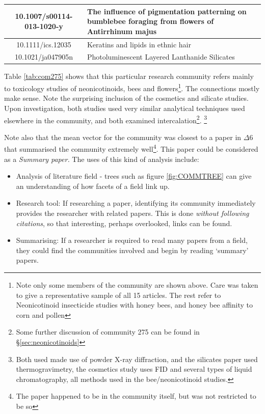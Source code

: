 \begin{table}[H]
\begin{tabular}{||c|X||}
10.1007/s00114-013-1020-y        & \footnotesize{The influence of pigmentation patterning on bumblebee foraging from flowers of Antirrhinum majus                                                                  } \\ \hline
10.1111/ics.12035                & \footnotesize{ Keratins and lipids in ethnic hair                                                                                                                                } \\ \hline
10.1021/ja047905n                & \footnotesize{Photoluminescent Layered Lanthanide Silicates                                                                                                                     } \\ \hline
\end{tabular}
\end{table}

Table \ref{tab:com275} shows that this particular research community refers mainly to toxicology studies of neonicotinoids,  bees and flowers\footnote{Note only some members of the community are shown above. Care was taken to give a representative sample of all 15 articles. The rest refer to Neonicotinoid insecticide studies with honey bees, and honey bee affinity to corn and pollen}. The connections mostly make sense. Note the surprising inclusion of the cosmetics and silicate studies. Upon investigation, both studies used very similar analytical techniques used elsewhere in the community, and both examined intercalation\footnote{Some further discussion of community 275 can be found in \S\ref{sec:neonicotinoids}}.
\footnote{Both used made use of powder X-ray diffraction, and the silicates paper used thermogravimetry, the cosmetics study uses FID and several types of liquid chromatography, all methods used in the bee/neonicotinoid studies.}

Note also that the mean vector for the community was closest to a paper in $\Delta6$ that summarised the community extremely well\footnote{The paper happened to be in the community itself, but was not restricted to be so}. This paper could be considered as a \emph{Summary paper.}
The uses of this kind of analysis include:
\begin{itemize}
\item Analysis of literature field -  trees such as figure \ref{fig:COMMTREE} can give an understanding of how facets of a field link up. 
\item Research tool: If researching a paper, identifying its community immediately provides the researcher with related papers. This is done \emph{without following citations}, so that interesting, perhaps overlooked, links can be found.
\item Summarising: If a researcher is required to read many papers from a field, they could find the communities involved and begin by reading `summary' papers. 
\end{itemize}

